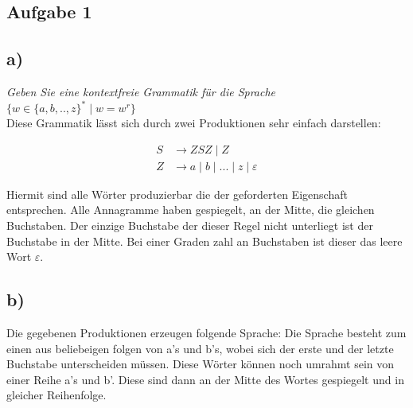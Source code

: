 \subsection*{Aufgabe 1}

\subsection*{a)}
\textit{ Geben Sie eine kontextfreie Grammatik für die Sprache $ \{w \in \{a,b, ..,z \}^{*} \mid w = w^{r} \}$ }
\\[1cm]

Diese Grammatik lässt sich durch zwei Produktionen sehr einfach darstellen:

\begin{align*}
	S & \to Z S Z \mid Z \\
	Z & \to a \mid b \mid ... \mid z \mid \varepsilon 
\end{align*}


Hiermit sind alle Wörter produzierbar die der geforderten Eigenschaft entsprechen. Alle Annagramme haben gespiegelt, an der Mitte, die gleichen Buchstaben. Der einzige Buchstabe der dieser Regel nicht unterliegt ist der Buchstabe in der Mitte. Bei einer Graden zahl an Buchstaben ist dieser das leere Wort $\varepsilon$.

\subsection*{b)}

Die gegebenen Produktionen erzeugen folgende Sprache: Die Sprache besteht zum einen aus beliebeigen folgen von a's und b's, wobei sich der erste und der letzte Buchstabe unterscheiden müssen. Diese Wörter können noch umrahmt sein von einer Reihe a's und b'. Diese sind dann an der Mitte des Wortes gespiegelt und in gleicher Reihenfolge.